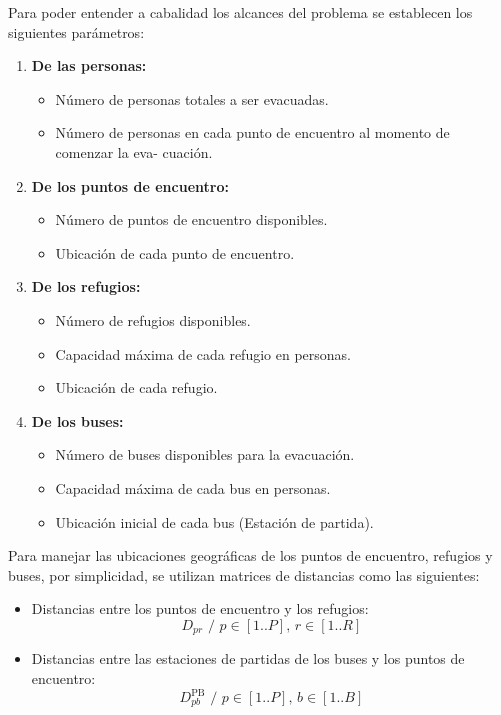 \documentclass[letter, 10pt]{article}
\begin{document}
    Para poder entender a cabalidad los alcances del problema se establecen los
    siguientes parámetros:
    \begin{enumerate}
        \item \textbf{De las personas:}
            \begin{itemize}
                \item Número de personas totales a ser evacuadas.
                \item 
                    Número de personas en cada punto
                    de encuentro al momento de comenzar la eva- cuación.
            \end{itemize}
        \item \textbf{De los puntos de encuentro:}
            \begin{itemize}
                \item Número de puntos de encuentro disponibles.
                \item Ubicación de cada punto de encuentro.
            \end{itemize}
        \item \textbf{De los refugios:}
            \begin{itemize}
                \item Número de refugios disponibles.
                \item Capacidad máxima de cada refugio en personas.
                \item Ubicación de cada refugio.
            \end{itemize}
        \item \textbf{De los buses:}
            \begin{itemize}
                \item Número de buses disponibles para la evacuación.
                \item Capacidad máxima de cada bus en personas.
                \item Ubicación inicial de cada bus (Estación de partida).
            \end{itemize}
    \end{enumerate}
    Para manejar las ubicaciones geográficas de los puntos de encuentro,
    refugios y buses, por simplicidad, se utilizan matrices de distancias como
    las siguientes:
    \begin{itemize}
        \item
            Distancias entre los puntos de encuentro y los refugios:
            $$D_{pr}\,\, /\,\, p \in [1..P], \, r \in [1..R]$$
        \item
            Distancias entre las estaciones de partidas de los buses y los
            puntos de encuentro:
            $$D^{\text{PB}}_{pb} \,\, /\,\, p \in [1..P], \, b \in [1..B]$$
    \end{itemize}
\end{document}
